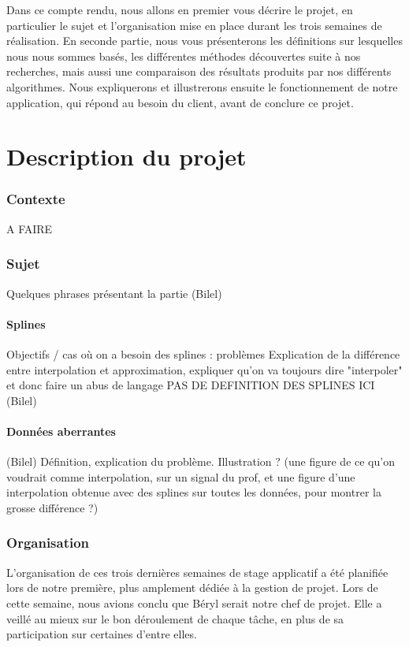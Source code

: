 \documentclass[a4paper,12pt]{article} %
\begin{document}
    Dans ce compte rendu, nous allons en premier vous décrire le projet, en particulier le sujet et l'organisation mise en place durant les trois semaines de réalisation. En seconde partie, nous vous présenterons les définitions sur lesquelles nous nous sommes basés, les différentes méthodes découvertes suite à nos recherches, mais aussi une comparaison des résultats produits par nos différents algorithmes. Nous expliquerons et illustrerons ensuite le fonctionnement de notre application, qui répond au besoin du client, avant de conclure ce projet.

\renewcommand\partname{}
\part{Description du projet}
    \section{Contexte}
        A FAIRE
	\section{Sujet}
		Quelques phrases présentant la partie (Bilel)
		\subsection{Splines}
			 Objectifs / cas où on a besoin des splines : problèmes
			Explication de la différence entre interpolation et approximation, expliquer qu'on va toujours dire "interpoler" et donc faire un abus de langage
			PAS DE DEFINITION DES SPLINES ICI
			(Bilel)
		\subsection{Données aberrantes}
		    (Bilel)
		    Définition, explication du problème. Illustration ? (une figure de ce qu'on voudrait comme interpolation, sur un signal du prof, et une figure d'une interpolation obtenue avec des splines sur toutes les données, pour montrer la grosse différence ?)
	\section{Organisation}
	    L'organisation de ces trois dernières semaines de stage applicatif a été planifiée lors de notre première, plus amplement dédiée à la gestion de projet.
        Lors de cette semaine, nous avions conclu que Béryl serait notre chef de projet. Elle a veillé au mieux sur le bon déroulement de chaque tâche, en plus de sa participation sur certaines d'entre elles.
    
\end{document}
